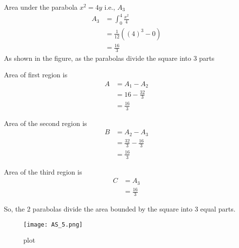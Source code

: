 \documentclass[journal,12pt,twocolumn]{IEEEtran}
\begin{document}
Area under the parabola $x^2 = 4y$ i.e., $A_3$
\begin{align}
    A_3 &= \int_0^4 \frac{x^2}{4}\\
    &= \frac{1}{12}((4)^3 - 0)\\
    &= \frac{16}{3}
\end{align}
As shown in the figure, as the parabolas divide the square into 3 parts

Area of first region is
\begin{align}
    A &= A_1 - A_2\\
    &= 16 - \frac{32}{3} \\
    &= \frac{16}{3}
\end{align}

Area of the second region is
\begin{align}
    B &= A_2 - A_3\\
    &= \frac{32}{3} - \frac{16}{3}\\
    &= \frac{16}{3}
\end{align}

Area of the third region is
\begin{align}
    C &= A_3\\
    &= \frac{16}{3}
\end{align}

So, the 2 parabolas divide the area bounded by the square into 3 equal parts.
\begin{figure}[ht]
\centering
\texttt{[image: AS\_5.png]}
\caption{plot}
\label{fig:my_label}
\end{figure}
\end{document}
